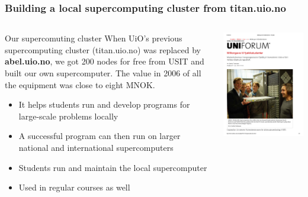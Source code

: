 \documentclass{beamer}
\begin{document}
\begin{frame}
\frametitle{Building a local supercomputing cluster from titan.uio.no}

\begin{columns}
\begin{block}{Our supercomuting cluster }
When UiO's previous supercomputing cluster (titan.uio.no) was replaced by \textbf{abel.uio.no}, we got 200 nodes for free from USIT and built our own supercomputer. The value in 2006 of all the equipment was close to eight MNOK.
\begin{itemize}
\item It helps students run and develop programs for large-scale problems locally

\item A successful program can then run on larger national and international supercomputers

\item Students run and maintain the local supercomputer

\item Used in regular courses as well
\end{itemize}

\noindent
\end{block}

\centerline{\includegraphics[width=1.0\linewidth]{fig-future/uniforum-0.png}}



\end{columns}
\end{frame}
\end{document}
